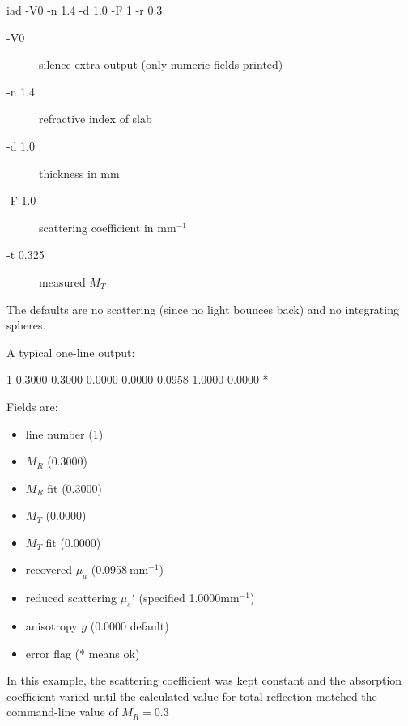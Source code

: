 \begin{grayverb}
iad -V0 -n 1.4 -d 1.0 -F 1 -r 0.3
\end{grayverb}

\begin{description}
  \item[\ttfamily -V0] silence extra output (only numeric fields printed)  
  \item[\ttfamily -n 1.4] refractive index of slab
  \item[\ttfamily -d 1.0] thickness in mm  
  \item[\ttfamily -F 1.0] scattering coefficient in mm$^{-1}$
  \item[\ttfamily -t 0.325] measured $M_T$  
\end{description}

The defaults are no scattering (since no light bounces back) and no integrating spheres. 

A typical one-line output:
\begin{grayverb}
 1 0.3000 0.3000 0.0000 0.0000 0.0958 1.0000 0.0000 *
 \end{grayverb}

Fields are:
\begin{itemize}
  \item line number (1)
  \item $M_R$ (0.3000)  
  \item $M_R$ fit (0.3000)  
  \item $M_T$ (0.0000)  
  \item $M_T$ fit (0.0000)  
  \item recovered $\mu_a$ (0.0958 mm$^{-1}$)  
  \item reduced scattering $\mu_s'$ (specified 1.0000mm$^{-1}$)  
  \item anisotropy $g$ (0.0000 default)  
  \item error flag (* means ok)  
\end{itemize}

In this example, the scattering coefficient was kept constant and the absorption coefficient varied until the calculated value for total
reflection matched the command-line value of $M_R = 0.3$
